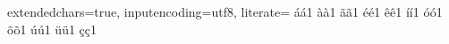 {  %
  extendedchars=true,
  inputencoding=utf8,
  literate=
    {á}{{\'a}}1
    {à}{{\`a}}1
    {ã}{{\~a}}1
    {é}{{\'e}}1
    {ê}{{\^e}}1
    {í}{{\'i}}1
    {ó}{{\'o}}1
    {õ}{{\~o}}1
    {ú}{{\'u}}1
    {ü}{{\"u}}1
    {ç}{{\c{c}}}1
}

